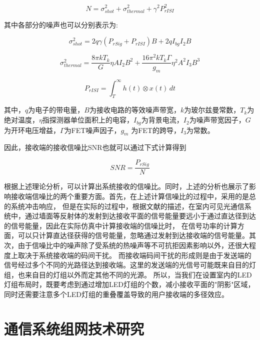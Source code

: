 \begin{equation}
    N=\sigma_{shot}^2+\sigma_{thermal}^{2}+\gamma^2P_{rISI}^2
\end{equation}

其中各部分的噪声也可以分别表示为\cite{KomineT2004}:

\begin{equation}
    \sigma_{shot}^2=2q\gamma(P_{rSig}+P_{rISI})B+2qI_{bg}I_{2}B
\end{equation}

\begin{equation}
    \sigma_{thermal}^2=\frac{8\pi kT_{k}}{G}\eta AI_{2}B^2+\frac{16\pi^2kT_{k}\Gamma}{g_{m}}\eta^2A^2I_{3}B^3
\end{equation}

\begin{equation}
    P_{rISI}=\int_{T}^{\infty}h(t) \otimes x(t)\, dt
\end{equation}

其中，$q$为电子的带电量，$B$为接收电路的等效噪声带宽，$k$为玻尔兹曼常数，$T_{k}$为绝对温度，$\eta$指探测器单位面积上的电容，$I_{bg}$为背景电流，$I_{2}$为噪声带宽因子，$G$为开环电压增益，$\Gamma$为FET噪声因子，$g_{m}$ 为FET的跨导，$I_{3}$为常数。

因此，接收端的接收信噪比SNR也就可以通过下式计算得到

\begin{equation}
    SNR=\frac{P_{rSig}}{N}
\end{equation}

根据上述理论分析，可以计算出系统接收的信噪比。同时，上述的分析也展示了影响接收端信噪比的两个重要方面。首先，在上述计算信噪比的过程中，采用的是总的系统冲击响应，
但是在实际的过程中，根据文献\cite{Yu2009}的描述，在室内可见光通信系统中，通过墙面等反射体的发射到达接收平面的信号能量要远小于通过直达径到达的信号能量，因此在实际仿真中计算接收端的信噪比时，
在信号功率的计算方面，可以只计算直达径获得的信号能量，忽略通过发射到达接收端的信号能量。其次，由于信噪比中的噪声除了受系统的热噪声等不可抗拒因素影响以外，还很大程度上取决于系统接收端的码间干扰。
而接收端码间干扰的形成则是由于发送端的信号经过多个不同的光路径达到接收端。这里的发送端的光信号可能既来自目的灯组，也来自目的灯组以外而定其他不同的光源。
所以，当我们在设置室内的LED灯组布局时，既要考虑到通过增加LED灯组的个数，减小接收平面的"阴影"区域，同时还需要注意多个LED灯组的重叠覆盖导致的用户接收端的多径效应\cite{DingDQ2006}。

\section{通信系统组网技术研究}\label{sec:network-tech-researh}
